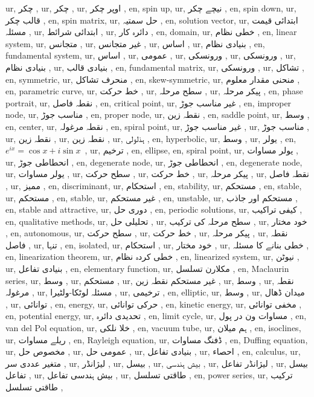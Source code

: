 ur, چکر ,
ur, چکر ,
ur, اوپر چکر ,
en, spin up,
ur, نیچے چکر ,
en, spin down,
ur, قالب چکر ,
en, spin matrix,
ur, حل سمتیہ ,
en, solution vector,
ur, ابتدائی قیمت مسئلہ ,
ur, ابتدائی شرائط ,
ur, دائرہ کار ,
en, domain,
ur, خطی نظام ,
en, linear system,
ur, متجانس ,
ur, غیر متجانس ,
ur, اساس ,
ur, بنیادی نظام ,
en, fundamental system,
ur, اساس ,
ur, عمومی ,
ur, ورونسکی ,
ur, ورونسکی ,
ur, بنیادی نظام ,
ur, بنیادی قالب ,
en, fundamental matrix,
ur, ورونسکی ,
ur, تشاکل ,
en, symmetric,
ur, منحرف تشاکل ,
en, skew-symmetric,
ur, منحنی مقدار معلوم ,
en, parametric curve,
ur, خط حرکت ,
ur, سطح مرحلہ ,
ur, پیکر مرحلہ ,
en, phase portrait,
ur, نقطہ فاصل ,
en, critical point,
ur, غیر مناسب جوڑ ,
en, improper node,
ur, مناسب جوڑ ,
en, proper node,
ur, نقطہ زین ,
en, saddle point,
ur, وسط ,
en, center,
ur, نقطہ مرغولہ ,
en, spiral point,
ur, غیر مناسب جوڑ ,
ur, مناسب جوڑ ,
ur, نقطہ زین ,
ur, نقطہ زین ,
ur, ہذلولی ,
en, hyperbolic,
ur, وسط ,
ur, یولر ,
en, $e^{ix}=\cos x+i\sin x\,\,\,$,
ur, ترخیم ,
en, ellipse,
en, spiral point,
ur, یولر مساوات ,
ur, انحطاطی جوڑ ,
en, degenerate node,
ur, انحطاطی جوڑ ,
en, degenerate node,
ur, یولر مساوات ,
ur, سطح حرکت ,
ur, خط حرکت ,
ur, پیکر مرحلہ ,
ur, نقطہ فاصل ,
ur, ممیز ,
en, discriminant,
ur, استحکام ,
en, stability,
ur, مستحکم ,
en, stable,
ur, مستحکم ,
en, stable,
ur, غیر مستحکم ,
en, unstable,
ur, مستحکم اور جاذب ,
en, stable and attractive,
ur, دوری حل ,
en, periodic solutions,
ur, کیفی تراکیب ,
en, qualitative methods,
ur, تحلیلی حل ,
ur, سطح مرحلہ کی ترکیب ,
ur, خود مختار ,
en, autonomous,
ur, سطح حرکت ,
ur, خط حرکت ,
ur, پیکر مرحلہ ,
ur, نقطہ فاصل ,
ur, تنہا ,
en, isolated,
ur, استحکام ,
ur, خود مختار ,
ur, خطی بنانے کا مسئلہ ,
en, linearization theorem,
ur, خطی کردہ نظام ,
en, linearized system,
ur, نیوٹن ,
ur, بنیادی تفاعل ,
en, elementary function,
ur, مکلارن تسلسل ,
en, Maclaurin series,
ur, وسط ,
ur, مستحکم ,
ur, غیر مستحکم نقطہ زین ,
ur, وسط ,
ur, نقطہ مرغولہ ,
ur, مسئلہ لوٹکا-ولٹیرا ,
ur, ترخیمی ,
en, elliptic,
ur, وسط ,
ur, میدان ڈھال ,
ur, توانائی ,
en, energy,
ur, حرکی توانائی ,
en, kinetic energy,
ur, مخفی توانائی ,
en, potential energy,
ur, تحدیدی دائرہ ,
en, limit cycle,
ur, مساوات ون در پول ,
en, van del Pol equation,
ur, خلا نلکی ,
en, vacuum tube,
ur, ہم میلان ,
en, isoclines,
ur, ریلے مساوات ,
en, Rayleigh equation,
ur, ڈفنگ مساوات ,
en, Duffing equation,
ur, مخصوص حل ,
ur, عمومی حل ,
ur, بنیادی تفاعل ,
ur, احصاء ,
en, calculus,
ur, متغیر عددی سر ,
ur, لیژانڈر ,
ur, بیسل ,
ur, بیش ہندسی ,
ur, لیژانڈر تفاعل ,
ur, بیسل تفاعل ,
ur, بیش ہندسی تفاعل ,
ur, طاقتی تسلسل ,
en, power series,
ur, ترکیب طاقتی تسلسل ,
